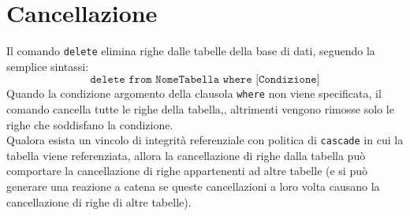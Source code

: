 	

\section{Cancellazione}
Il comando \texttt{delete} elimina righe dalle tabelle della base di dati, seguendo la semplice sintassi:
	$$\texttt{delete from NomeTabella where [Condizione]}$$
Quando la condizione argomento della clausola \texttt{where} non viene specificata, il comando cancella tutte le righe della tabella,, altrimenti vengono rimosse solo le righe che soddisfano la condizione.\\
Qualora esista un vincolo di integrità referenziale con politica di \texttt{cascade} in cui la tabella viene referenziata, allora la cancellazione di righe dalla tabella può comportare la cancellazione di righe appartenenti ad altre tabelle (e si può generare una reazione a catena se queste cancellazioni a loro volta causano la cancellazione di righe di altre tabelle).



